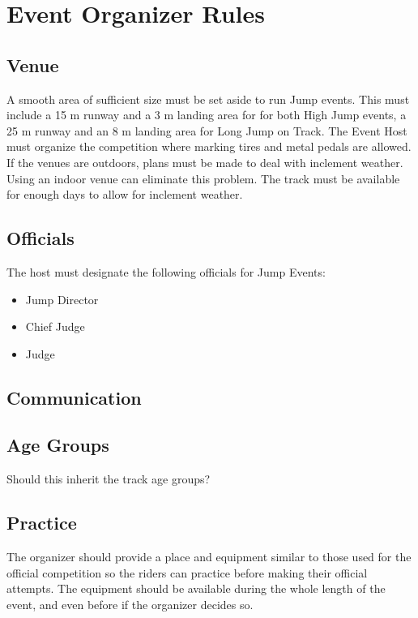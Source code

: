 \chapter{Event Organizer Rules}

\section{Venue}
A smooth area of sufficient size must be set aside to run Jump events.
This must include a 15 m runway and a 3 m landing area for for both High Jump events, a 25 m runway and an 8 m landing area for Long Jump on Track.
The Event Host must organize the competition where marking tires and metal pedals are allowed.
If the venues are outdoors, plans must be made to deal with inclement weather.
Using an indoor venue can eliminate this problem.
The track must be available for enough days to allow for inclement weather.

\section{Officials}

The host must designate the following officials for Jump Events:
\begin{itemize}
\item Jump Director
\item Chief Judge
\item Judge
\end{itemize}

\begin{comment2016}
\section{Communication}
\end{comment2016}


\begin{comment2016}
\section{Age Groups}

Should this inherit the track age groups?
\end{comment2016}

\section{Practice}

The organizer should provide a place and equipment similar to those used for the official competition so the riders can practice before making their official attempts.
The equipment should be available during the whole length of the event, and even before if the organizer decides so.

